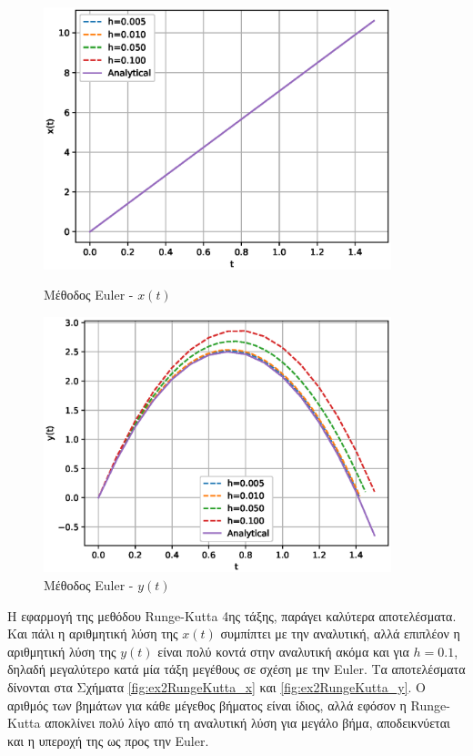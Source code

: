 \documentclass[assignment4.tex]{subfiles}
\begin{document}
\begin{figure}[hp]
	\includegraphics[width=0.9\textwidth]{ex2Euler_x.eps}
	\centering
	\caption{Μέθοδος \textlatin{Euler} - $x(t)$}
	\label{fig:ex2Euler_x}
	\includegraphics[width=0.9\textwidth]{ex2Euler_y.eps}
	\centering
	\caption{Μέθοδος \textlatin{Euler} - $y(t)$}
	\label{fig:ex2Euler_y}
\end{figure}

Η εφαρμογή της μεθόδου \textlatin{Runge-Kutta} 4ης τάξης, παράγει καλύτερα αποτελέσματα. Και πάλι η αριθμητική λύση της $x(t)$ συμπίπτει με την αναλυτική, αλλά επιπλέον η αριθμητική λύση της $y(t)$ είναι πολύ κοντά στην αναλυτική ακόμα και για $h=0.1$, δηλαδή μεγαλύτερο κατά μία τάξη μεγέθους σε σχέση με την \textlatin{Euler}. Τα αποτελέσματα δίνονται στα Σχήματα \ref{fig:ex2RungeKutta_x} και \ref{fig:ex2RungeKutta_y}. O αριθμός των βημάτων για κάθε μέγεθος βήματος είναι ίδιος, αλλά εφόσον η \textlatin{Runge-Kutta} αποκλίνει πολύ λίγο από τη αναλυτική λύση για μεγάλο βήμα, αποδεικνύεται και η υπεροχή της ως προς την \textlatin{Euler}.
\end{document}
